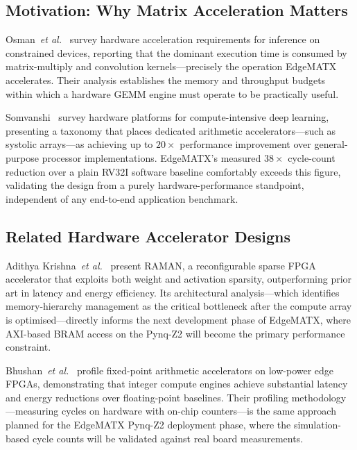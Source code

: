 ﻿\documentclass[12pt,a4paper]{report}
\begin{document}
\subsection{Motivation: Why Matrix Acceleration Matters}

Osman~\textit{et al.}~\cite{osman2022tinyml} survey hardware
acceleration requirements for inference on constrained devices,
reporting that the dominant execution time is consumed by
matrix-multiply and convolution kernels---precisely the operation
EdgeMATX accelerates.
Their analysis establishes the memory and throughput budgets within
which a hardware GEMM engine must operate to be practically useful.

Somvanshi~\cite{saha2025tinydl} survey hardware
platforms for compute-intensive deep learning, presenting a
taxonomy that places dedicated arithmetic accelerators---such as
systolic arrays---as achieving up to $20\times$ performance
improvement over general-purpose processor implementations.
EdgeMATX's measured $38\times$ cycle-count reduction over a plain
RV32I software baseline comfortably exceeds this figure,
validating the design from a purely hardware-performance
standpoint, independent of any end-to-end application benchmark.


\subsection{Related Hardware Accelerator Designs}

Adithya Krishna~\textit{et al.}~\cite{saiteja2024raman} present RAMAN,
a reconfigurable sparse FPGA accelerator that exploits both weight
and activation sparsity, outperforming prior art in latency and
energy efficiency.
Its architectural analysis---which identifies memory-hierarchy
management as the critical bottleneck after the compute array is
optimised---directly informs the next development phase of EdgeMATX,
where AXI-based BRAM access on the Pynq-Z2 will become the
primary performance constraint.

Bhushan~\textit{et al.}~\cite{moosmann2025deploying} profile
fixed-point arithmetic accelerators on low-power edge FPGAs,
demonstrating that integer compute engines achieve substantial
latency and energy reductions over floating-point baselines.
Their profiling methodology---measuring cycles on hardware with
on-chip counters---is the same approach planned for the EdgeMATX
Pynq-Z2 deployment phase, where the simulation-based cycle counts
will be validated against real board measurements.
\end{document}
